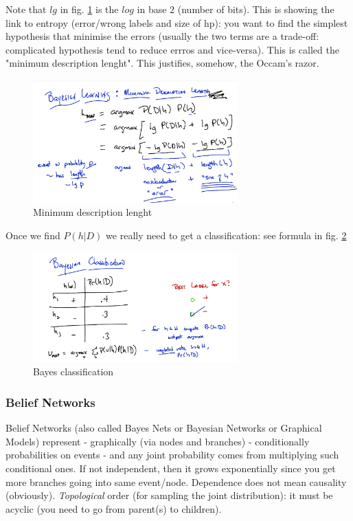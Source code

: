 \documentclass[11pt]{article}
\begin{document}
Note that $lg$ in fig. \ref{bayesian_learning3} is the $log$ in base $2$ (number of bits). This is showing the link to entropy (error/wrong labels and size of hp): you want to find the simplest hypothesis that minimise the errors (usually the two terms are a trade-off: complicated hypothesis tend to reduce errros and vice-versa). This is called the "minimum description lenght". This justifies, somehow, the Occam's razor.
\begin{figure}[htbp] 
	\centering
	\includegraphics[width=0.7\textwidth]{pics/bayesian_learning_3}
	\caption{Minimum description lenght} 
	\label{bayesian_learning3}
\end{figure}

Once we find $P(h|D)$ we really need to get a classification: see formula in fig. \ref{bayesian_learning4} 
\begin{figure}[htbp] 
	\centering
	\includegraphics[width=0.7\textwidth]{pics/bayesian_learning_4}
	\caption{Bayes classification} 
	\label{bayesian_learning4}
\end{figure}

\subsubsection{Belief Networks}
Belief Networks (also called Bayes Nets or Bayesian Networks or Graphical Models) represent - graphically (via nodes and branches) - conditionally probabilities on events - and any joint probability comes from multiplying such conditional ones. If not independent, then it grows exponentially since you get more branches going into same event/node. Dependence does not mean causality (obviously). \textit{Topological} order (for sampling the joint distribution): it must be acyclic (you need to go from parent(s) to children).
\end{document}
